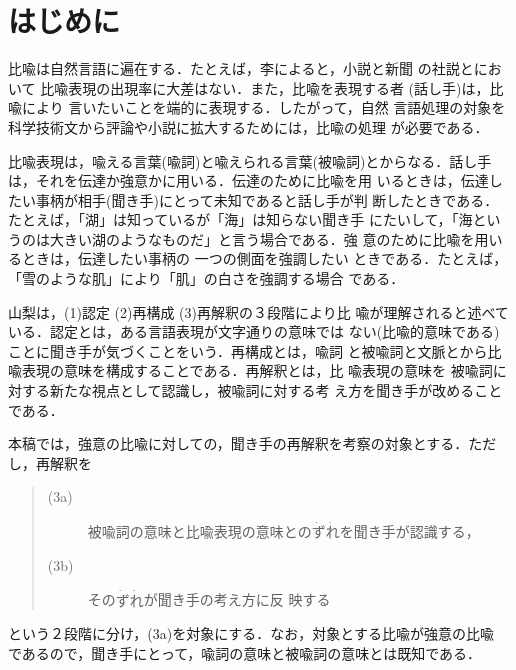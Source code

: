 

\maketitle
\section{はじめに}
\label{sec:introduction}
比喩は自然言語に遍在する．たとえば，李\cite{Yi82}によると，小説と新聞
の社説とにおいて 比喩表現の出現率に大差はない．また，比喩を表現する者
(話し手)は，比喩により 言いたいことを端的に表現する．したがって，自然
言語処理の対象を科学技術文から評論や小説に拡大するためには，比喩の処理
が必要である．

比喩表現は，喩える言葉(喩詞)と喩えられる言葉(被喩詞)とからなる．話し手
は，それを伝達か強意かに用いる\cite{Nakamura77a}．伝達のために比喩を用
いるときは，伝達したい事柄が相手(聞き手)にとって未知であると話し手が判
断したときである．たとえば，「湖」は知っているが「海」は知らない聞き手
にたいして，「海というのは大きい湖のようなものだ」と言う場合である．強
意のために比喩を用いるときは，伝達したい事柄の 一つの側面を強調したい
ときである．たとえば，「雪のような肌」により「肌」の白さを強調する場合
である．

山梨\cite{Yamanashi88}は，(1)認定 (2)再構成 (3)再解釈の３段階により比
喩が理解されると述べている．認定とは，ある言語表現が文字通りの意味では
ない(比喩的意味である)ことに聞き手が気づくことをいう．再構成とは，喩詞
と被喩詞と文脈とから比喩表現の意味を構成することである．再解釈とは，比
喩表現の意味を 被喩詞に対する新たな視点として認識し，被喩詞に対する考
え方を聞き手が改めることである．

本稿では，強意の比喩に対しての，聞き手の再解釈を考察の対象とする．ただ
し，再解釈を
\begin{quote}
\begin{description}
\item[(3a)] 被喩詞の意味と比喩表現の意味との$\dot{\mbox{ず}}
\dot{\mbox{れ}}$を聞き手が認識する，
\item[(3b)] その$\dot{\mbox{ず}}\dot{\mbox{れ}}$が聞き手の考え方に反
映する
\end{description}
\end{quote}
という２段階に分け，(3a)を対象にする．なお，対象とする比喩が強意の比喩
であるので，聞き手にとって，喩詞の意味と被喩詞の意味とは既知である．

